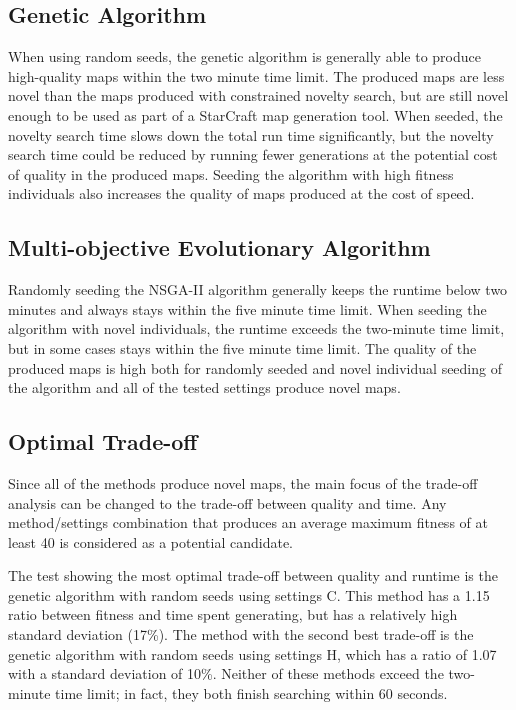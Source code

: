 \subsection{Genetic Algorithm}
\label{discussion_comparison_geneticalgorithm}
When using random seeds, the genetic algorithm is generally able to produce high-quality maps within the two minute time limit. The produced maps are less novel than the maps produced with constrained novelty search, but are still novel enough to be used as part of a StarCraft map generation tool. When seeded, the novelty search time slows down the total run time significantly, but the novelty search time could be reduced by running fewer generations at the potential cost of quality in the produced maps. Seeding the algorithm with high fitness individuals also increases the quality of maps produced at the cost of speed.

\subsection{Multi-objective Evolutionary Algorithm}
\label{discussion_comparison_moea}
Randomly seeding the NSGA-II algorithm generally keeps the runtime below two minutes and always stays within the five minute time limit. When seeding the algorithm with novel individuals, the runtime exceeds the two-minute time limit, but in some cases stays within the five minute time limit. The quality of the produced maps is high both for randomly seeded and novel individual seeding of the algorithm and all of the tested settings produce novel maps.

\subsection{Optimal Trade-off}
\label{discussion_comparison_tradeoff}
Since all of the methods produce novel maps, the main focus of the trade-off analysis can be changed to the trade-off between quality and time. Any method/settings combination that produces an average maximum fitness of at least 40 is considered as a potential candidate.

The test showing the most optimal trade-off between quality and runtime is the genetic algorithm with random seeds using settings C. This method has a 1.15 ratio between fitness and time spent generating, but has a relatively high standard deviation (17\%). The method with the second best trade-off is the genetic algorithm with random seeds using settings H, which has a ratio of 1.07 with a standard deviation of 10\%. Neither of these methods exceed the two-minute time limit; in fact, they both finish searching within 60 seconds.

